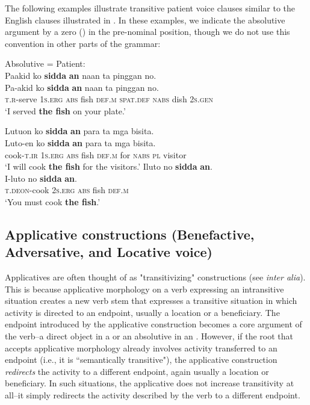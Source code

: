 The following examples illustrate transitive patient voice clauses similar to the English clauses illustrated in . In these examples, we indicate the absolutive argument by a zero (\emptyset{}) in the pre-nominal position, though we do not use this convention in other parts of the grammar:


\ea
Absolutive = Patient: \\
Paakid  ko  \emptyset{}  \textbf{sidda}  \textbf{an}  naan  ta  pinggan  no. \\\smallskip
\gll Pa-akid  ko  \emptyset{}  \textbf{sidda}  \textbf{an}  naan  ta  pinggan  no. \\
\textsc{t.r}-serve  1\textsc{s.erg}  \textsc{abs}  fish  \textsc{def.m}  \textsc{spat.def}  \textsc{nabs}  dish  2\textsc{s.gen} \\
\glt ‘I served \textbf{the fish} on your plate.’
\z

\newpage
\ea
Lutuon  ko  \emptyset{}  \textbf{sidda}  \textbf{an}  para  ta  mga  bisita. \\\smallskip
\gll Luto-en  ko  \emptyset{}  \textbf{sidda}  \textbf{an}  para  ta  mga  bisita. \\
cook-\textsc{t.ir}  1\textsc{s.erg}  \textsc{abs}  fish  \textsc{def.m}  for  \textsc{nabs}  \textsc{pl}  visitor \\
\glt ‘I will cook \textbf{the fish} for the visitors.’
\z
\ea
Iluto  no  \emptyset{}  \textbf{sidda}  \textbf{an}. \\\smallskip
\gll I-luto  no  \emptyset{}  \textbf{sidda}  \textbf{an}. \\
\textsc{t.deon}-cook  2\textsc{s.erg}  \textsc{abs}  fish  \textsc{def.m} \\
\glt ‘You must cook \textbf{the fish}.’
\z
\subsection{Applicative constructions (Benefactive, Adversative, and Locative voice)}
\label{sec:applicativevoice}
Applicatives are often thought of as "transitivizing" constructions (see \citealt{polinsky2013, payne1997}  \textit{inter alia}). This is because applicative morphology on a verb expressing an intransitive situation creates a new verb stem that expresses a transitive situation in which activity is directed to an endpoint, usually a location or a beneficiary. The endpoint introduced by the applicative construction becomes a core argument of the verb--a direct object in a  or an absolutive in an . However, if the root that accepts applicative morphology already involves activity transferred to an endpoint (i.e., it is “semantically transitive"), the applicative construction \textit{redirects} the activity to a different endpoint, again usually a location or beneficiary. In such situations, the applicative does not increase transitivity at all--it simply redirects the activity described by the verb to a different endpoint.

